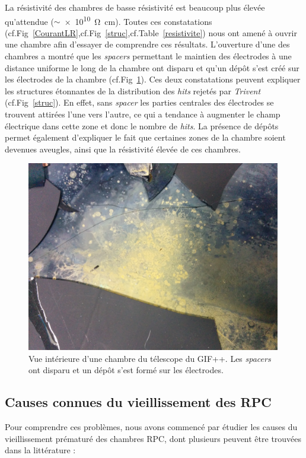 La résistivité des chambres de basse résistivité est beaucoup plus élevée qu'attendue ($\sim$\SI{e10}{\ohm.\centi\meter}). Toutes ces constatations (cf.Fig~\ref{CourantLR},cf.Fig~\ref{struc},cf.Table~\ref{resistivite}) nous ont amené à ouvrir une chambre afin d'essayer de comprendre ces résultats.
\vspace{0.4cm}
\newpage
L'ouverture d'une des chambres a montré que les \textit{spacers} permettant le maintien des électrodes à une distance uniforme le long de la chambre ont disparu et qu'un dépôt s'est créé sur les électrodes de la chambre (cf.Fig~\ref{depot}). Ces deux constatations peuvent expliquer les structures étonnantes de la distribution des \textit{hits} rejetés par \textit{Trivent} (cf.Fig~\ref{struc}). En effet, sans \textit{spacer} les parties centrales des électrodes se trouvent attirées l'une vers l'autre, ce qui a tendance à augmenter le champ électrique dans cette zone et donc le nombre de \textit{hits}. La présence de dépôts permet également d'expliquer le fait que certaines zones de la chambre soient devenues aveugles, ainsi que la résistivité élevée de ces chambres.
\vspace*{0.3cm}
\begin{figure}[!ht]
	\centering
	\includegraphics[width=0.99\textwidth]{GLA/depot.jpg}
	\caption{Vue intérieure d'une chambre du télescope du GIF++. Les \textit{spacers} ont disparu et un dépôt s'est formé sur les électrodes.}
	\label{depot}
\end{figure}

\subsection{Causes connues du vieillissement des RPC }
Pour comprendre ces problèmes, nous avons commencé par étudier les causes du vieillissement prématuré des chambres RPC, dont plusieurs peuvent être trouvées dans la littérature :

